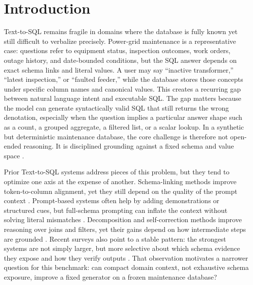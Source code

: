 \documentclass[cmc,article,submit,moreauthors,pdftex]{Definitions/tsp}
\begin{document}
\section{Introduction}\label{introduction}

Text-to-SQL remains fragile in domains where the database is fully known yet still difficult to verbalize precisely. Power-grid maintenance is a representative case: questions refer to equipment status, inspection outcomes, work orders, outage history, and date-bounded conditions, but the SQL answer depends on exact schema links and literal values. A user may say ``inactive transformer,'' ``latest inspection,'' or ``faulted feeder,'' while the database stores those concepts under specific column names and canonical values. This creates a recurring gap between natural language intent and executable SQL. The gap matters because the model can generate syntactically valid SQL that still returns the wrong denotation, especially when the question implies a particular answer shape such as a count, a grouped aggregate, a filtered list, or a scalar lookup. In a synthetic but deterministic maintenance database, the core challenge is therefore not open-ended reasoning. It is disciplined grounding against a fixed schema and value space \cite{zhong2020semantic,lei2020reexamining,liu2022semantic,quamar2022natural}.

Prior Text-to-SQL systems address pieces of this problem, but they tend to optimize one axis at the expense of another. Schema-linking methods improve token-to-column alignment, yet they still depend on the quality of the prompt context \cite{lei2020reexamining,gan2021robustness,liu2021awakening}. Prompt-based systems often help by adding demonstrations or structured cues, but full-schema prompting can inflate the context without solving literal mismatches \cite{chang2023prompt,nan2023enhancing,sun2023sqlprompt}. Decomposition and self-correction methods improve reasoning over joins and filters, yet their gains depend on how intermediate steps are grounded \cite{pourreza2023dinsql,wang2023macsql,talaei2024chess}. Recent surveys also point to a stable pattern: the strongest systems are not simply larger, but more selective about which schema evidence they expose and how they verify outputs \cite{liu2024survey,katsogiannismeimarakis2023survey,huang2024survey}. That observation motivates a narrower question for this benchmark: can compact domain context, not exhaustive schema exposure, improve a fixed generator on a frozen maintenance database?
\end{document}
